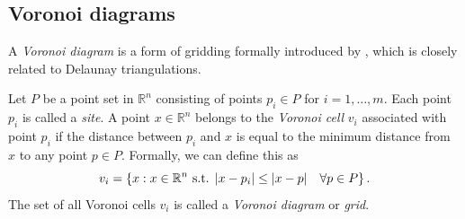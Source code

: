 \subsection{Voronoi diagrams}
A \emph{Voronoi diagram} is a form of gridding formally introduced by \textcite{VoronoiNouvellesAD}, which is closely related to Delaunay triangulations. 

\begin{definition}
\label{def:voronoi}
Let $P$ be a point set in $\mathbb{R}^n$ consisting of points $p_i \in P$ for $i = 1,\dots,m$. Each point $p_i$ is called a \emph{site}. A point $x \in \mathbb{R}^n$ belongs to the \emph{Voronoi cell} $v_i$ associated with point $p_i$ if the distance between $p_i$ and $x$ is equal to the minimum distance from $x$ to any point $p \in P$. Formally, we can define this as
\begin{equation}
    v_i = \left\{ x : x \in \mathbb{R}^n \text{ s.t. } \lvert x - p_i\rvert \leq \lvert x - p\rvert\quad \forall p \in P \right\}.
\end{equation}
The set of all Voronoi cells $v_i$ is called a \emph{Voronoi diagram} or \emph{grid}.
\end{definition}

